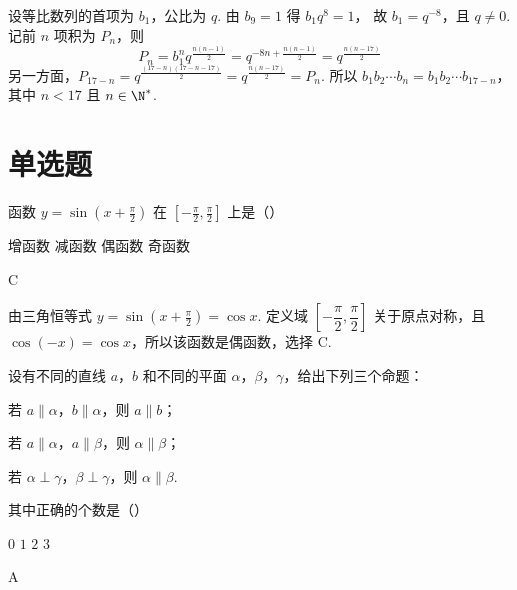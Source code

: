 \begin{solution}
设等比数列的首项为 \(b_1\)，公比为 \(q\). 由 \(b_9=1\) 得
\(b_1q^8=1\)，
故 \(b_1=q^{-8}\)，且 \(q\neq0\). 记前 \(n\) 项积为 \(P_n\)，则
\[
P_n=b_1^nq^{\frac{n(n-1)}2}
=q^{-8n+\frac{n(n-1)}2}
=q^{\frac{n(n-17)}2}
\]
另一方面，\(P_{17-n}=q^{\frac{(17-n)(17-n-17)}2}=q^{\frac{n(n-17)}2}=P_n\).
所以
\(b_1b_2\cdots b_n=b_1b_2\cdots b_{17-n}\)，其中 \(n<17\) 且 \(n\in\N^{*}\).
\end{solution}

\section{单选题}
\begin{problem}
函数 \(y=\sin\left(x+\frac{\pi}{2}\right)\) 在 \(\left[-\frac{\pi}{2},\frac{\pi}{2}\right]\) 上是（\quad）

\choices
    {增函数}
    {减函数}
    {偶函数}
    {奇函数}
\end{problem}

\begin{answer}
C
\end{answer}

\begin{solution}
由三角恒等式
\(y=\sin\left(x+\frac\pi2\right)=\cos x\).
定义域 \(\left[-\dfrac\pi2,\dfrac\pi2\right]\) 关于原点对称，且 \(\cos(-x)=\cos x\)，所以该函数是偶函数，选择 C.
\end{solution}

\begin{problem}
设有不同的直线 \(a\)，\(b\) 和不同的平面 \(\alpha\)，\(\beta\)，\(\gamma\)，给出下列三个命题：

\begin{circlelist}
\item 若 \(a\parallel \alpha\)，\(b\parallel \alpha\)，则 \(a\parallel b\)；
\item 若 \(a\parallel \alpha\)，\(a\parallel \beta\)，则 \(\alpha\parallel \beta\)；
\item 若 \(\alpha\perp \gamma\)，\(\beta\perp \gamma\)，则 \(\alpha\parallel \beta\).
\end{circlelist}

其中正确的个数是（\quad）

\choices
    {\(0\)}
    {\(1\)}
    {\(2\)}
    {\(3\)}
\end{problem}

\begin{answer}
A
\end{answer}

